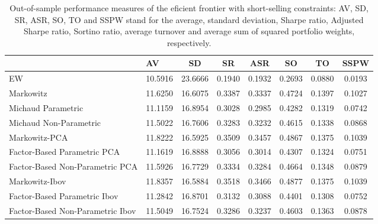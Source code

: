 \begin{table}

\caption{\label{tab:empirical_ef_2}Out-of-sample performance measures of the eficient frontier with short-selling constraints: AV, SD, SR, ASR, SO, TO and SSPW stand for the average, standard deviation, Sharpe ratio, Adjusted Sharpe ratio, Sortino ratio, average turnover and average sum of squared portfolio weights, respectively.}
\centering
\begin{tabular}[t]{l|l|c|c|c|c|c|c}
\hline
  & AV & SD & SR & ASR & SO & TO & SSPW\\
\hline
EW & 10.5916 & 23.6666 & 0.1940 & 0.1932 & 0.2693 & 0.0880 & 0.0193\\
\hline
Markowitz & 11.6250 & 16.6075 & 0.3387 & 0.3337 & 0.4724 & 0.1397 & 0.1027\\
\hline
Michaud Parametric & 11.1159 & 16.8954 & 0.3028 & 0.2985 & 0.4282 & 0.1319 & 0.0742\\
\hline
Michaud Non-Parametric & 11.5022 & 16.7606 & 0.3283 & 0.3232 & 0.4615 & 0.1338 & 0.0868\\
\hline
Markowitz-PCA & 11.8222 & 16.5925 & 0.3509 & 0.3457 & 0.4867 & 0.1375 & 0.1039\\
\hline
Factor-Based Parametric PCA & 11.1619 & 16.8888 & 0.3056 & 0.3014 & 0.4307 & 0.1324 & 0.0751\\
\hline
Factor-Based Non-Parametric PCA & 11.5926 & 16.7729 & 0.3334 & 0.3284 & 0.4664 & 0.1348 & 0.0879\\
\hline
Markowitz-Ibov & 11.8357 & 16.5884 & 0.3518 & 0.3466 & 0.4877 & 0.1375 & 0.1039\\
\hline
Factor-Based Parametric Ibov & 11.2842 & 16.8701 & 0.3132 & 0.3088 & 0.4401 & 0.1308 & 0.0752\\
\hline
Factor-Based Non-Parametric Ibov & 11.5049 & 16.7524 & 0.3286 & 0.3237 & 0.4603 & 0.1363 & 0.0878\\
\hline
\end{tabular}
\end{table}
